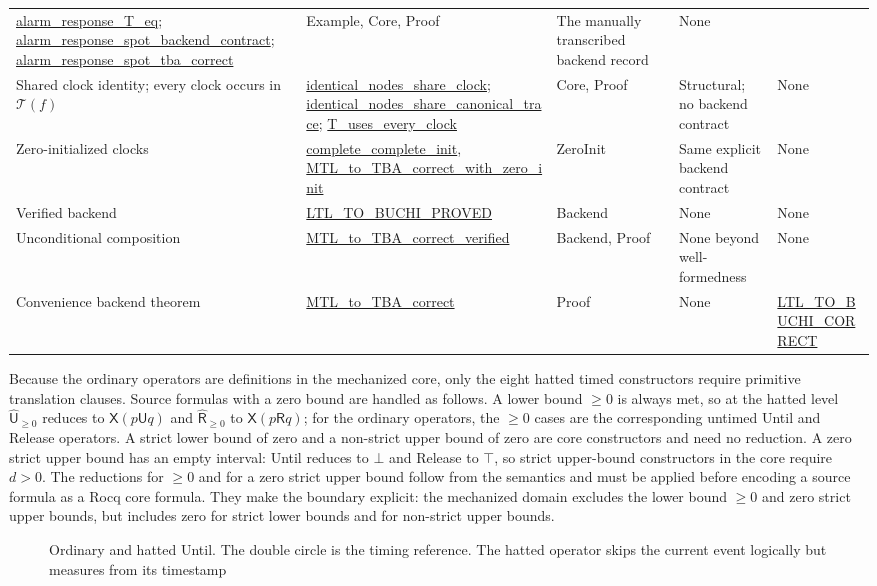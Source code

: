 \documentclass[manuscript]{acmart}
\newcommand{\Until}{\mathbin{\mathsf{U}}}
\newcommand{\Release}{\mathbin{\mathsf{R}}}
\newcommand{\hUntil}{\mathbin{\widehat{\mathsf{U}}}}
\newcommand{\hRelease}{\mathbin{\widehat{\mathsf{R}}}}
\newcommand{\Next}{\mathsf{X}}
\newcommand{\T}{\mathcal{T}}
\newcommand{\Rocqid}[1]{\url{#1}}
\begin{document}
\begin{table}[t]
\begin{tabular}{@{}p{}p{}p{}p{}p{}@{}}
\Rocqid{alarm_response_T_eq};
\Rocqid{alarm_response_spot_backend_contract};
\Rocqid{alarm_response_spot_tba_correct} &
Example, Core, Proof &
The manually transcribed backend record &
None\\
Shared clock identity; every clock occurs in $\T(f)$ &
\Rocqid{identical_nodes_share_clock};
\Rocqid{identical_nodes_share_canonical_trace};
\Rocqid{T_uses_every_clock} &
Core, Proof &
Structural; no backend contract &
None\\
Zero-initialized clocks &
\Rocqid{complete_complete_init}, \Rocqid{MTL_to_TBA_correct_with_zero_init} &
ZeroInit &
Same explicit backend contract &
None\\
Verified backend &
\Rocqid{LTL_TO_BUCHI_PROVED} &
Backend &
None &
None\\
Unconditional composition &
\Rocqid{MTL_to_TBA_correct_verified} &
Backend, Proof &
None beyond well-formedness &
None\\
Convenience backend theorem &
\Rocqid{MTL_to_TBA_correct} &
Proof &
None &
\Rocqid{LTL_TO_BUCHI_CORRECT}\\
\bottomrule
\end{tabular}
\end{table}
Because the ordinary operators are definitions in the mechanized core, only
the eight hatted timed constructors require primitive translation clauses.
Source formulas with a zero bound are handled as follows. A lower bound
$\ge0$ is always met, so at the hatted level $\hUntil_{\ge0}$ reduces to
$\Next(p\Until q)$ and $\hRelease_{\ge0}$ to $\Next(p\Release q)$; for the
ordinary operators, the $\ge0$ cases are the corresponding untimed Until and
Release operators. A strict lower bound of zero and a non-strict upper bound of
zero are core constructors and need no reduction. A zero strict upper bound has
an empty interval: Until reduces to $\bot$ and Release to $\top$, so strict
upper-bound constructors in the core require $d>0$. The reductions for $\ge0$
and for a zero strict upper bound follow from the semantics and must be applied
before encoding a source formula as a Rocq core formula. They make the boundary
explicit: the mechanized domain excludes the lower bound $\ge0$ and zero strict
upper bounds, but includes zero for strict lower bounds and for non-strict upper
bounds.

\begin{figure}[t]
\centering

\caption{Ordinary and hatted Until. The double circle is the timing reference.
The hatted operator skips the current event logically but measures from its
timestamp}
\label{fig:hatted-until}
\end{figure}
\end{document}
